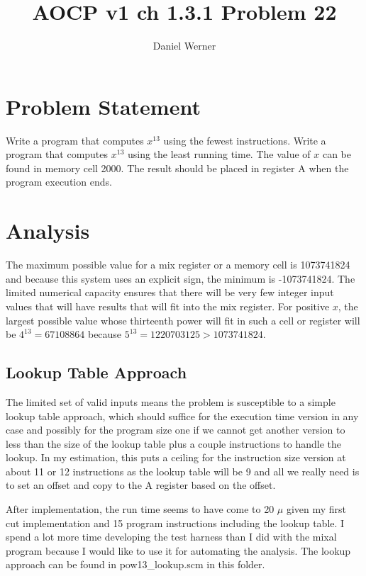 \documentclass{article}
\title{AOCP v1 ch 1.3.1 Problem 22}
\author{Daniel Werner}
\begin{document}
\maketitle

\section*{
    Problem Statement
}

Write a program that computes $x^{13}$ using the fewest instructions.  Write a
program that computes $x^{13}$ using the least running time.  The value of $x$
can be found in memory cell 2000.  The result should be placed in register A
when the program execution ends.

\section*{
    Analysis
}

The maximum possible value for a mix register or a memory cell
is 1073741824 and because this system uses an explicit sign,
the minimum is -1073741824.  The limited numerical capacity ensures
that there will be very few integer input values that will have
results that will fit into the mix register.  For positive $x$, the largest
possible value whose thirteenth power will fit in such a cell
or register will be $4^{13}=67108864$ because $5^{13}=1220703125 >
1073741824$.

\subsection* {
  Lookup Table Approach
}
The limited set of valid inputs means the problem is susceptible to a
simple lookup table approach, which should suffice for the
execution time version in any case and possibly for the
program size one if we cannot get another version to less
than the size of the lookup table plus a couple instructions
to handle the lookup.  In my estimation, this puts a ceiling
for the instruction size version at about 11 or 12 instructions
as the lookup table will be 9 and all we really need is to
set an offset and copy to the A register based on the offset.

\par

After implementation, the run time seems to have come to 20 $\mu$ given my
first cut implementation and 15 program instructions including the
lookup table.  I spend a lot more time developing the
test harness than I did with the mixal program because I would like
to use it for automating the analysis.  The lookup approach can be
found in pow13\_lookup.scm in this folder.
\end{document}
